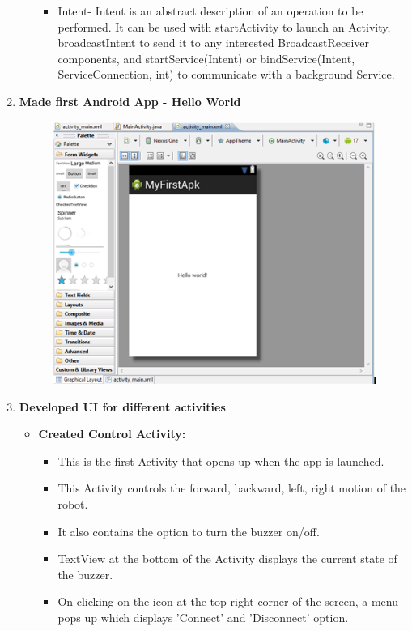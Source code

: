 \documentclass[a4paper,12pt,oneside]{book}
\begin{document}
\begin{enumerate}
\begin{itemize}
\begin{itemize}
				\item Intent- Intent is an abstract description of an operation to be performed. It can be used with startActivity to launch an Activity, broadcastIntent to send it to any interested BroadcastReceiver components, and startService(Intent) or bindService(Intent, ServiceConnection, int) to communicate with a background Service. 
			\end{itemize}
		\end{itemize}
		\newpage
		\item \textbf{\large Made first Android App - Hello World} 
			\begin{figure}[h]
				\begin{center}
					\includegraphics[scale=0.75]{helloworld.png}
				\end{center}
			\end{figure}
		\item \textbf{\large Developed UI for different activities}
		\begin{itemize}
		    	\item \textbf{Created Control Activity:}
		    	\begin{itemize}
		    	\item This is the first Activity that opens up when the app is launched.
				\item This Activity controls the forward, backward, left, right motion of the robot.
				\item It also contains the option to turn the buzzer on/off.
				\item TextView at the bottom of the Activity displays the current state of the buzzer.
				\item On clicking on the icon at the top right corner of the screen, a menu pops up which displays 'Connect' and 'Disconnect' option. 
				

\end{itemize}
\end{itemize}
\end{enumerate}
\end{document}
